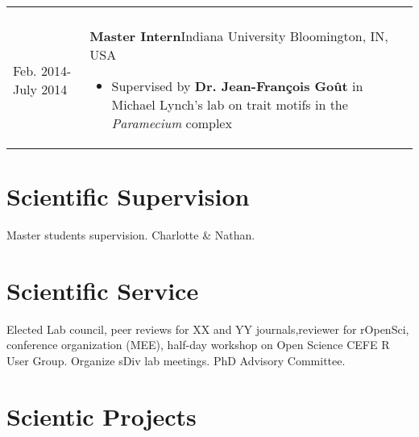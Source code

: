 \documentclass[10pt,a4paper,]{article}
\begin{document}
\begin{longtable}{@{\extracolsep{\fill}}ll}
{\begin{minipage}{0.7\textwidth}
\end{minipage}%
\vspace{\parsep}}\\
Feb. 2014-July 2014 & \parbox[t]{0.85\textwidth}{%
\textbf{Master Intern}\hfill{\footnotesize Indiana University}\newline
  Bloomington, IN, USA\par%
  \vspace{0.1cm}\begin{minipage}{0.7\textwidth}%
\begin{itemize}%
\item Supervised by \textbf{Dr. Jean-François Goût} in Michael Lynch's lab on trait motifs in the \textit{Paramecium} complex%
\end{itemize}%
\end{minipage}%
\vspace{\parsep}}\\
\end{longtable}

\hypertarget{scientific-supervision}{%
\section{Scientific Supervision}\label{scientific-supervision}}

Master students supervision. Charlotte \& Nathan.

\hypertarget{scientific-service}{%
\section{Scientific Service}\label{scientific-service}}

Elected Lab council, peer reviews for XX and YY journals,reviewer for
rOpenSci, conference organization (MEE), half-day workshop on Open
Science CEFE R User Group. Organize sDiv lab meetings. PhD Advisory
Committee.

\hypertarget{scientic-projects}{%
\section{Scientic Projects}\label{scientic-projects}}
\end{document}
